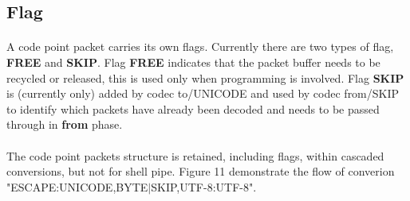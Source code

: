 \documentclass{article}
\begin{document}
		\subsection{Flag}
			\paragraph{}
			A code point packet carries its own flags. Currently there are two types of flag, \textbf{FREE} and \textbf{SKIP}. Flag \textbf{FREE} indicates that the packet buffer needs to be recycled or released, this is used only when programming is involved. Flag \textbf{SKIP} is (currently only) added by codec to/UNICODE and used by codec from/SKIP to identify which packets have already been decoded and needs to be passed through in \textbf{from} phase. 
			\paragraph{}
			The code point packets structure is retained, including flags, within cascaded conversions, but not for shell pipe. Figure 11 demonstrate the flow of converion "ESCAPE:UNICODE,BYTE$|$SKIP,UTF-8:UTF-8".
\end{document}
